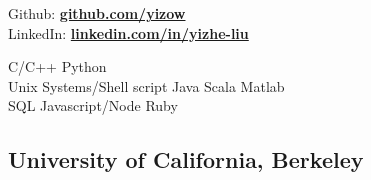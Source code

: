\documentclass[]{resume}
\begin{document}
%
%
\lastupdated

%
%

%
%

\begin{minipage}[t]{0.33\textwidth} 




Github: \href{https://github.com/yizow}{\bf github.com/yizow} \\
LinkedIn:  \href{https://www.linkedin.com/in/yizhe-liu/}{\bf linkedin.com/in/yizhe-liu} \\




C/C++ \textbullet{} Python \\
Unix Systems/Shell script \textbullet{} Java \textbullet{} Scala \textbullet{} Matlab \\
SQL \textbullet{} Javascript/Node \textbullet{} Ruby \\
\sectionsep




\subsection{University of California, Berkeley}
\sectionsep

%
%

\end{minipage} 
\hfill
\end{document}
